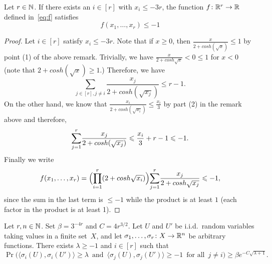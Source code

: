 \begin{lemma}
  \label{lem:special:function:2} %
  \leanok
  Let \(r \in \mathbb{N}\). If there exists an \(i \in [r]\) with \(x_i \le - 3r\), the function \(f \colon \mathbb{R}^r \rightarrow \mathbb{R}\) defined in~\eqref{eq:f} satisfies
  \begin{equation*}
    f(x_1,\dots,x_r) \le -1
  \end{equation*}
\end{lemma}
%
\begin{proof}
  Let \(i \in [r]\) satisfy \(x_i \leq -3r\). Note that if \(x\geq 0\), then \(\frac{x}{2+cosh(\sqrt{x})}\leq 1\) by point (1) of the above remark.
  Trivially, we have \(\frac{x}{2+cosh{\sqrt{x}}}<0\leq 1\) for \(x<0\) (note that \(2+cosh(\sqrt{x})\geq 1\).)
  Therefore, we have 
  \begin{equation*}
    \underset{j \in [r], j \neq i}{\sum} \frac{x_j}{2+cosh(\sqrt{x_j})} \leq r-1.
  \end{equation*}
  On the other hand, we know that \(\frac{x_i}{2+cosh(\sqrt{x_i})} \leq \frac{x_i}{3}\) by part (2) in the remark above and therefore,
  \begin{equation*}
    \overunderset{r}{j=1}{\sum}\frac{x_j}{2+cosh(\sqrt{x_j})}\leq \frac{x_i}{3}+r-1\leq -1.
  \end{equation*}
  Finally we write 
  \begin{equation*}
    f(x_1,\dots,x_r) = \Bigl(\overunderset{r}{i=1}{\prod}(2+cosh\sqrt{x_i})\Bigr)\overunderset{r}{j=1}{\sum}\frac{x_j}{2+cosh \sqrt{x_j}} \leq -1,
  \end{equation*}
  since the sum in the last term is \(\leq -1\) while the product is at least \(1\) (each factor in the product is at least 1).
\end{proof}


\begin{lemma}
  \label{lem:geometric} %
  Let \(r, n\in\mathbb{N}\). Set \(\beta = 3^{-4r}\) and \(C = 4r^{3/2}\).
  Let \(U\) and \(U'\) be i.i.d.~random variables taking values in a finite set~\(X\), and let \(\sigma_1,\ldots,\sigma_r \colon X \rightarrow \mathbb{R}^n\) be arbitrary functions. There exists \(\lambda\ge-1\) and \(i\in[r]\) such that
  \begin{equation*}
    \Pr\Big( \big\langle \sigma_i(U),\sigma_i(U') \big\rangle \ge \lambda \, \text{ and } \, \big\langle \sigma_j(U), \sigma_j(U') \big\rangle \ge -1 \, \text{ for all } \, j \ne i \Big) \ge \beta e^{- C\sqrt{\lambda + 1}}.
  \end{equation*}
\end{lemma}

